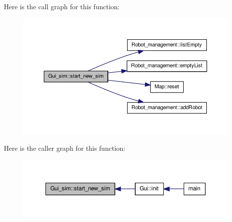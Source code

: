 Here is the call graph for this function\-:\nopagebreak
\begin{figure}[H]
\begin{center}
\leavevmode
\includegraphics[width=350pt]{class_gui__sim_abb1df0449546eb8b1004a6160291ecad_cgraph}
\end{center}
\end{figure}




Here is the caller graph for this function\-:\nopagebreak
\begin{figure}[H]
\begin{center}
\leavevmode
\includegraphics[width=350pt]{class_gui__sim_abb1df0449546eb8b1004a6160291ecad_icgraph}
\end{center}
\end{figure}




